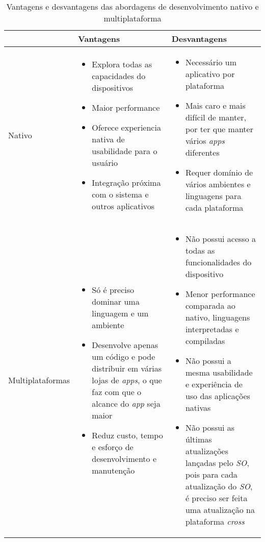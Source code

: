 \begin{table}[h]
	\centering
	{\renewcommand\arraystretch{1.25}
		\begin{tabular}{|l|l|l|} \hline
			& \multicolumn{1}{l|}{Vantagens} & \multicolumn{1}{l|}{Desvantagens}  \\ \hline\hline
			Nativo& 
			\multicolumn{1}{p{6cm}|}{\raggedright 
					\begin{itemize}
						\item Explora todas as capacidades do dispositivos
						\item Maior performance
						\item Oferece experiencia nativa de usabilidade para o usuário
						\item Integração próxima com o sistema e outros aplicativos
					\end{itemize}
				} & 
			\multicolumn{1}{p{6cm}|}{\raggedright 
					\begin{itemize}
						\item Necessário um aplicativo por plataforma
						\item Mais caro e mais difícil de manter, por ter que manter vários \textit{apps} diferentes
						\item Requer domínio de vários ambientes e linguagens para cada plataforma
					\end{itemize}				
				}\\ \hline
			
			Multiplataformas& 
			\multicolumn{1}{p{6cm}|}{\raggedright 
					\begin{itemize}		
						\item Só é preciso dominar uma linguagem e um ambiente
						\item Desenvolve apenas um código e pode distribuir em várias lojas de \textit{apps}, o que faz com que o alcance do \textit{app} seja maior
						\item Reduz custo, tempo e esforço de desenvolvimento e manutenção
					\end{itemize}		
				} & 
			\multicolumn{1}{p{6cm}|}{\raggedright 
					\begin{itemize}		
						\item Não possui acesso a todas as funcionalidades do dispositivo
						\item Menor performance comparada ao nativo, linguagens interpretadas e compiladas
						\item Não possui a mesma usabilidade e experiência de uso das aplicações nativas
						\item Não possui as últimas atualizações lançadas pelo \textit{SO}, pois para cada atualização do \textit{SO}, é preciso ser feita uma atualização na plataforma \textit{cross}											
					\end{itemize}												
				}\\ \hline
		\end{tabular}}
	\caption{Vantagens e desvantagens das abordagens de desenvolvimento nativo e multiplataforma }
	\label{tab:vantxdesva}
\end{table}